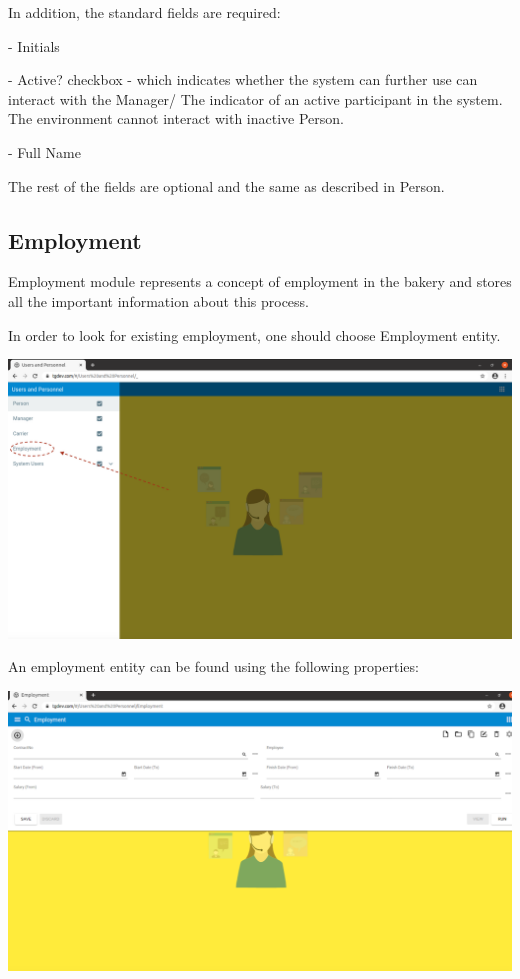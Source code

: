 In addition, the standard fields are required:

- Initials

- Active? checkbox - which indicates whether the system can further use can interact with the Manager/ The indicator of an active participant in the system. The environment cannot interact with inactive Person.

- Full Name

The rest of the fields are optional and the same as described in Person.

\subsection{Employment}

Employment module represents a concept of employment in the bakery and stores all the important information about this process.

In order to look for existing employment, one should choose Employment entity.

\includegraphics[width=\textwidth]{sections/01-chapter/images/employment11.png}

An employment entity can be found using the following properties:

\includegraphics[width=\textwidth]{sections/01-chapter/images/employment2.png}

